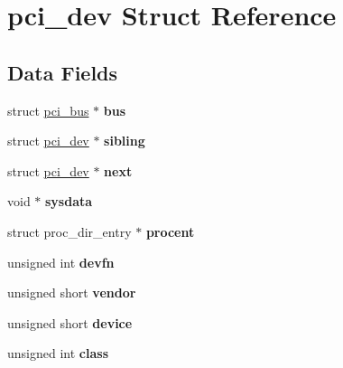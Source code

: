 \hypertarget{structpci__dev}{}\section{pci\+\_\+dev Struct Reference}
\label{structpci__dev}
\subsection*{Data Fields}
\begin{DoxyCompactItemize}
\item 
\mbox{\label{structpci__dev_a0426b876e89e5839c476c82b726d5169}} 
struct \mbox{\hyperlink{structpci__bus}{pci\+\_\+bus}} $\ast$ {\bfseries bus}
\item 
\mbox{\label{structpci__dev_a0d16d3b87559a042554bbafca58451d4}} 
struct \mbox{\hyperlink{structpci__dev}{pci\+\_\+dev}} $\ast$ {\bfseries sibling}
\item 
\mbox{\label{structpci__dev_ac16ff738da55059a7b6814e5213fabde}} 
struct \mbox{\hyperlink{structpci__dev}{pci\+\_\+dev}} $\ast$ {\bfseries next}
\item 
\mbox{\label{structpci__dev_aa496512da41f4b64a532031e5c1e361f}} 
void $\ast$ {\bfseries sysdata}
\item 
\mbox{\label{structpci__dev_aefc1c94339f61ededd7a5e73d141968f}} 
struct proc\+\_\+dir\+\_\+entry $\ast$ {\bfseries procent}
\item 
\mbox{\label{structpci__dev_a1120396fd6a9a1051584ca3b967715e1}} 
unsigned int {\bfseries devfn}
\item 
\mbox{\label{structpci__dev_a94bcfcd381cd81754e87863863777c69}} 
unsigned short {\bfseries vendor}
\item 
\mbox{\label{structpci__dev_a9fdef0195dd00e128ecafbb248b9eeaa}} 
unsigned short {\bfseries device}
\item 
\mbox{\label{structpci__dev_a9e55f6b3a8bcd079edaf343c698bc615}} 
unsigned int {\bfseries class}
\item 

\end{DoxyCompactItemize}
